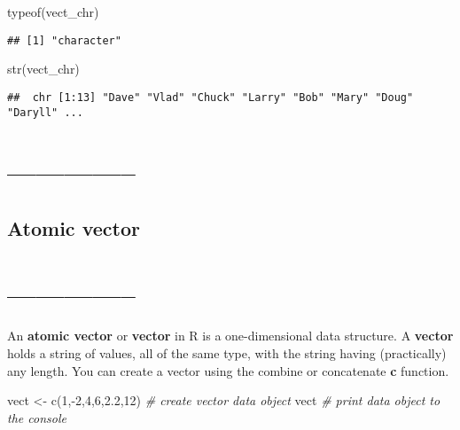 \documentclass[
]{article}
\newenvironment{Shaded}{\begin{snugshade}}{\end{snugshade}}
\newcommand{\CommentTok}[1]{\textcolor[rgb]{0.56,0.35,0.01}{\textit{#1}}}
\newcommand{\DecValTok}[1]{\textcolor[rgb]{0.00,0.00,0.81}{#1}}
\newcommand{\FloatTok}[1]{\textcolor[rgb]{0.00,0.00,0.81}{#1}}
\newcommand{\FunctionTok}[1]{\textcolor[rgb]{0.00,0.00,0.00}{#1}}
\newcommand{\NormalTok}[1]{#1}
\newcommand{\OtherTok}[1]{\textcolor[rgb]{0.56,0.35,0.01}{#1}}
\newcommand{\SpecialCharTok}[1]{\textcolor[rgb]{0.00,0.00,0.00}{#1}}
\begin{document}
\begin{Shaded}
\begin{Highlighting}[]
\FunctionTok{typeof}\NormalTok{(vect\_chr)}
\end{Highlighting}
\end{Shaded}

\begin{verbatim}
## [1] "character"
\end{verbatim}

\begin{Shaded}
\begin{Highlighting}[]
\FunctionTok{str}\NormalTok{(vect\_chr)}
\end{Highlighting}
\end{Shaded}

\begin{verbatim}
##  chr [1:13] "Dave" "Vlad" "Chuck" "Larry" "Bob" "Mary" "Doug" "Daryll" ...
\end{verbatim}

\hypertarget{section-16}{%
\section{--------------}\label{section-16}}

\hypertarget{atomic-vector}{%
\subsection{Atomic vector}\label{atomic-vector}}

\hypertarget{section-17}{%
\section{--------------}\label{section-17}}

An \textbf{atomic vector} or \textbf{vector} in R is a one-dimensional
data structure. A \textbf{vector} holds a string of values, all of the
same type, with the string having (practically) any length. You can
create a vector using the combine or concatenate \textbf{c} function.

\begin{Shaded}
\begin{Highlighting}[]
\NormalTok{vect }\OtherTok{\textless{}{-}} \FunctionTok{c}\NormalTok{(}\DecValTok{1}\NormalTok{,}\SpecialCharTok{{-}}\DecValTok{2}\NormalTok{,}\DecValTok{4}\NormalTok{,}\DecValTok{6}\NormalTok{,}\FloatTok{2.2}\NormalTok{,}\DecValTok{12}\NormalTok{) }\CommentTok{\# create vector data object}
\NormalTok{vect  }\CommentTok{\# print data object to the console}
\end{Highlighting}
\end{Shaded}
\end{document}

